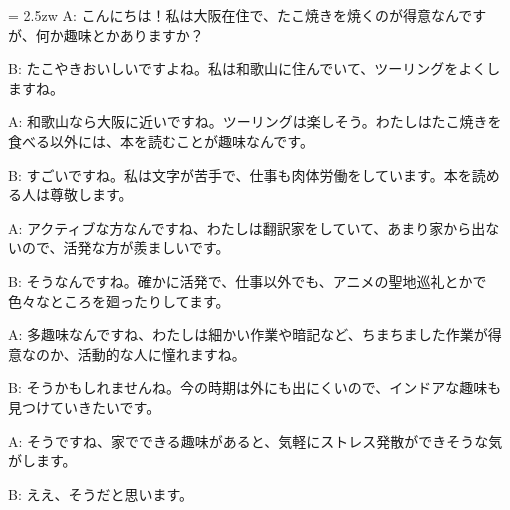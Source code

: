 \documentclass[11pt]{amsart}
\title{}
\author{}
\newenvironment{hangall}[1]{\hangindent = 2.5zw\everypar{\hangindent = 2.5zw}}{}
\begin{document}
\maketitle
\begin{hangall}{}%
A: こんにちは！私は大阪在住で、たこ焼きを焼くのが得意なんですが、何か趣味とかありますか？



B: たこやきおいしいですよね。私は和歌山に住んでいて、ツーリングをよくしますね。



A: 和歌山なら大阪に近いですね。ツーリングは楽しそう。わたしはたこ焼きを食べる以外には、本を読むことが趣味なんです。



B: すごいですね。私は文字が苦手で、仕事も肉体労働をしています。本を読める人は尊敬します。



A: アクティブな方なんですね、わたしは翻訳家をしていて、あまり家から出ないので、活発な方が羨ましいです。



B: そうなんですね。確かに活発で、仕事以外でも、アニメの聖地巡礼とかで色々なところを廻ったりしてます。



A: 多趣味なんですね、わたしは細かい作業や暗記など、ちまちました作業が得意なのか、活動的な人に憧れますね。



B: そうかもしれませんね。今の時期は外にも出にくいので、インドアな趣味も見つけていきたいです。



A: そうですね、家でできる趣味があると、気軽にストレス発散ができそうな気がします。



B: ええ、そうだと思います。\end{hangall}
\end{document}
